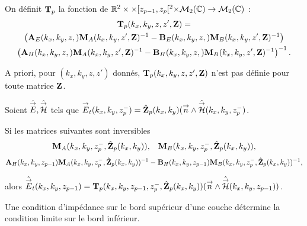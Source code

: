     \begin{defn}%
      \label{def:plan:transfert:impedance}

      On définit \(\mathbf{T}_p\) la fonction de \(\mathbb R^2\times\times [z_{p-1}, z_p[^2\times\mathcal{M}_2(\mathbb C)\rightarrow \mathcal{M}_{2}(\mathbb C)\) :
      \begin{multline*}
        \mathbf{T}_p(k_x,k_y,z,z',\mathbf{Z}) = \\
          \left(\mathbf{A}_{E}(k_x,k_y,z,)\mathbf{M}_{A}(k_x,k_y,z',\mathbf{Z})^{-1} - \mathbf{B}_{E}(k_x,k_y,z,)\mathbf{M}_{B}(k_x,k_y,z',\mathbf{Z})^{-1}\right) 
          \\
          \left(\mathbf{A}_{H}(k_x,k_y,z,)\mathbf{M}_{A}(k_x,k_y,z',\mathbf{Z})^{-1} - \mathbf{B}_{H}(k_x,k_y,z,)\mathbf{M}_{B}(k_x,k_y,z',\mathbf{Z})^{-1}\right)^{-1}.
      \end{multline*}
    \end{defn}

    A priori, pour \((k_x,k_y,z,z')\) donnés, \(\mathbf{T}_p(k_x,k_y,z,z',\mathbf{Z})\) n'est pas définie pour toute matrice \(\mathbf{Z}\).

    \begin{prop}%
      \label{prop:plan:transfert:impedance}

      Soient \(\hat{{\overset{\rightarrow}{E}}},\hat{{\overset{\rightarrow}{\mathcal{H}}}}\) tels que \({\overset{\rightarrow}{E}}_t(k_x,k_y,z_p^-) = \hat{\mathbf{Z}}_{p}(k_x,k_y)({\overset{\rightarrow}{n}} \wedge \hat{{\overset{\rightarrow}{\mathcal{H}}}}(k_x,k_y,z_p^-)\).

      Si les matrices suivantes sont inversibles
      \begin{align*}
        \mathbf{M}_{A}(k_x,k_y,z_p^-, \hat{\mathbf{Z}}_{p}(k_x,k_y)), && \mathbf{M}_{B}(k_x,k_y,z_p^-, \hat{\mathbf{Z}}_{p}(k_x,k_y)),
      \end{align*}
      \begin{align*}
        \mathbf{A}_{H}(k_x,k_y,z_{p-1})\mathbf{M}_{A}(k_x,k_y,z_p^-, \hat{\mathbf{Z}}_{p}(k_x,k_y))^{-1} - \mathbf{B}_{H}(k_x,k_y,z_{p-1})\mathbf{M}_{B}(k_x,k_y,z_p^-, \hat{\mathbf{Z}}_{p}(k_x,k_y))^{-1},
      \end{align*}

      alors \(\hat{{\overset{\rightarrow}{E}}}_t(k_x,k_y,z_{p-1}) = \mathbf{T}_p(k_x,k_y,z_{p-1},z_p^-,\hat{\mathbf{Z}}_{p}(k_x,k_y))({\overset{\rightarrow}{n}} \wedge \hat{{\overset{\rightarrow}{\mathcal{H}}}}(k_x,k_y,z_{p-1}))\).

      Une condition d'impédance sur le bord supérieur d'une couche détermine la condition limite sur le bord inférieur.
    \end{prop}


